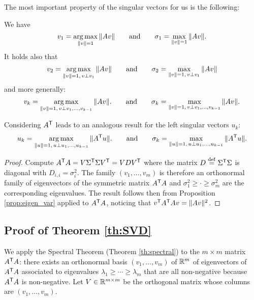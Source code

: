 \documentclass[11pt,nocut]{article}
\begin{document}
The most important property of the singular vectors for us is the following:
\begin{proposition}
	We have
	\begin{equation}
		v_1 = \operatorname*{arg\,max}_{\|v\| = 1} \|A v\| 
		\qquad \text{and} \qquad 
		\sigma_1 = \max_{\|v\| = 1} \|A v\|.
	\end{equation}
	It holds also that
	\begin{equation}
		v_2 = \operatorname*{arg\,max}_{\|v\| = 1, \, v \perp v_1} \| A v \|
		\qquad \text{and} \qquad 
		\sigma_2 = \max_{\|v\| = 1, \, v \perp v_1} \| A v \|
	\end{equation}
	and more generally:
	\begin{equation}
		v_{k}   = \operatorname*{arg\,max}_{\|v\| = 1, \, v \perp v_1, \dots, v_{k-1}} \| A v \|.
		\qquad \text{and} \qquad 
		\sigma_{k} = \max_{\|v\| = 1, \, v \perp v_1, \dots, v_{k-1}} \| A v \|.
	\end{equation}
\end{proposition}
\begin{remark}
	Considering $A^{{\sf T}}$ leads to an analogous result for the left singular vectors $u_k$:
	\begin{equation}
		u_{k}   = \operatorname*{arg\,max}_{\|u\| = 1, \, u \perp u_1, \dots, u_{k-1}} \| A^{{\sf T}} u \|.
		\qquad \text{and} \qquad 
		\sigma_{k} = \max_{\|u\| = 1, \, u \perp u_1, \dots, u_{k-1}} \| A^{{\sf T}} u \|.
	\end{equation}
\end{remark}
\begin{proof}
	Compute $A^{{\sf T}} A = V \Sigma^{{\sf T}} \Sigma V^{{\sf T}} = V D V^{{\sf T}}$ where the matrix $D \overset{\rm def}{=} \Sigma^{{\sf T}} \Sigma$ is diagonal with $D_{i,i} = \sigma_i^2$. The family $(v_1, \dots, v_m)$ is therefore an orthonormal family of eigenvectors of the symmetric matrix $A^{{\sf T}} A$ and $\sigma_1^2 \geq \cdot \geq \sigma_m^2$ are the corresponding eigenvalues. The result follows then from Proposition \ref{prop:eigen_var} applied to $A^{{\sf T}} A$, noticing that $v^{{\sf T}} A^{{\sf T}} A v = \|Av\|^2$.
\end{proof}


\subsection{Proof of Theorem \ref{th:SVD}}
We apply the Spectral Theorem (Theorem \ref{th:spectral}) to the $m \times m$ matrix $A^{{\sf T}} A$: there exists an orthonormal basis $(v_1, \dots, v_m)$ of $\mathbb{R}^m$ of eigenvectors of $A^{{\sf T}} A$ associated to eigenvalues $\lambda_1 \geq \cdots \geq \lambda_m$ that are all non-negative because $A^{{\sf T}} A$ is non-negative.
Let $V \in \mathbb{R}^{m \times m}$ be the orthogonal matrix whose columns are $(v_1, \dots, v_m)$.
\\
\end{document}

